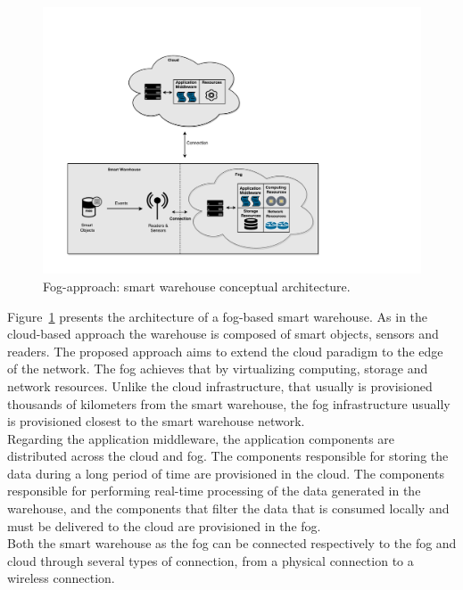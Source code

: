 \begin{figure}[ht!]
  \centering
  \includegraphics[width=\textwidth]{./images/solution_fog_architecture}
  \caption[Fog-approach: conceptual architecture.]{Fog-approach: smart warehouse conceptual architecture.}
  \label{fig:solution_fog_architecture}
\end{figure}

Figure~\ref{fig:solution_fog_architecture} presents the architecture of a fog-based smart warehouse.
As in the cloud-based approach the warehouse is composed of smart objects, sensors and readers.
The proposed approach aims to extend the cloud paradigm to the edge of the network. The fog achieves
that by virtualizing computing, storage and network resources. Unlike the cloud infrastructure, that
usually is provisioned thousands of kilometers from the smart warehouse, the fog infrastructure
usually is provisioned closest to the smart warehouse network.\\

Regarding the application middleware, the application components are distributed across the cloud and
fog. The components responsible for storing the data during a long period of time are provisioned in
the cloud. The components responsible for performing real-time processing of the data generated in the
warehouse, and the components that filter the data that is consumed locally and must be delivered to
the cloud are provisioned in the fog.\\

Both the smart warehouse as the fog can be connected respectively to the fog and cloud through
several types of connection, from a physical connection to a wireless connection.

